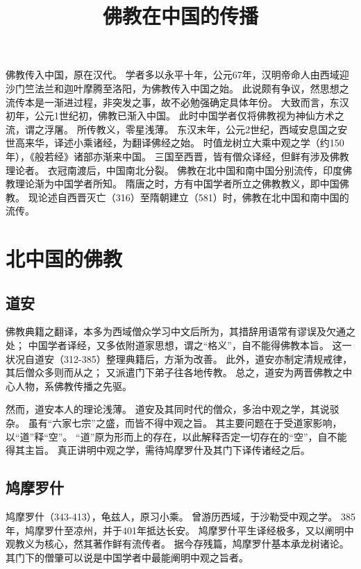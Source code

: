 \documentclass[11pt]{article}
\title{佛教在中国的传播}
\date{}
\begin{document}
  \maketitle

  \linenumbers
  
佛教传入中国，原在汉代。
学者多以永平十年，公元67年，汉明帝命人由西域迎沙门竺法兰和迦叶摩腾至洛阳，为佛教传入中国之始。
此说颇有争议，然思想之流传本是一渐进过程，非突发之事，故不必勉强确定具体年份。
大致而言，东汉初年，公元1世纪初，佛教已渐入中国。
此时中国学者仅将佛教视为神仙方术之流，谓之浮屠。
所传教义，零星浅薄。
东汉末年，公元2世纪，西域安息国之安世高来华，译述小乘诸经，为翻译佛经之始。
时值龙树立大乘中观之学（约150年），《般若经》诸部亦渐来中国。
三国至西晋，皆有僧众译经，但鲜有涉及佛教理论者。
衣冠南渡后，中国南北分裂。
佛教在北中国和南中国分别流传，印度佛教理论渐为中国学者所知。
隋唐之时，方有中国学者所立之佛教教义，即中国佛教。
现论述自西晋灭亡（316）至隋朝建立（581）时，佛教在北中国和南中国的流传。

\section{北中国的佛教}
\subsection{道安}
佛教典籍之翻译，本多为西域僧众学习中文后所为，其措辞用语常有谬误及欠通之处；
中国学者译经，又多依附道家思想，谓之“格义”，自不能得佛教本旨。
这一状况自道安（312-385）整理典籍后，方渐为改善。
此外，道安亦制定清规戒律，其后僧众多则而从之；
又派遣门下弟子往各地传教。
总之，道安为两晋佛教之中心人物，系佛教传播之先驱。

\newline

然而，道安本人的理论浅薄。
道安及其同时代的僧众，多治中观之学，其说驳杂。
虽有“六家七宗”之盛，而皆不得中观之旨。
其主要问题在于受道家影响，以“道”释“空”。
“道”原为形而上的存在，以此解释否定一切存在的“空”，自不能得其主旨。
真正讲明中观之学，需待鸠摩罗什及其门下译传诸经之后。

\subsection{鸠摩罗什}
鸠摩罗什（343-413），龟兹人，原习小乘。
曾游历西域，于沙勒受中观之学。
385年，鸠摩罗什至凉州，并于401年抵达长安。
鸠摩罗什平生译经极多，又以阐明中观教义为核心，然其著作鲜有流传者。
据今存残篇，鸠摩罗什基本承龙树诸论。
其门下的僧肇可以说是中国学者中最能阐明中观之旨者。
\end{document}
